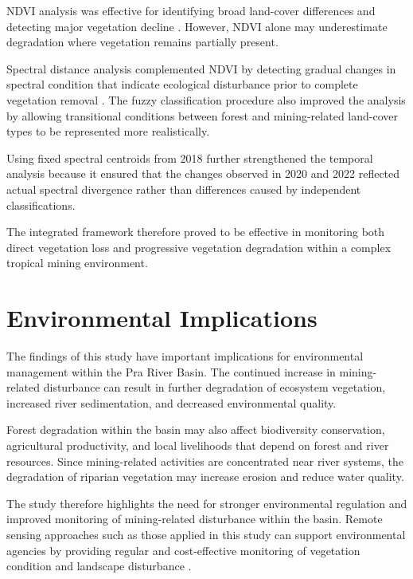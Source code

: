 \documentclass[a4paper,12pt]{report}
\begin{document}
NDVI analysis was effective for identifying broad land-cover differences and detecting major vegetation decline \citep{huete2002overview,pettorelli2005ndvi}. However, NDVI alone may underestimate degradation where vegetation remains partially present.

Spectral distance analysis complemented NDVI by detecting gradual changes in spectral condition that indicate ecological disturbance prior to complete vegetation removal \citep{richards2013remote,singh1989review}. The fuzzy classification procedure also improved the analysis by allowing transitional conditions between forest and mining-related land-cover types to be represented more realistically.

Using fixed spectral centroids from 2018 further strengthened the temporal analysis because it ensured that the changes observed in 2020 and 2022 reflected actual spectral divergence rather than differences caused by independent classifications.

The integrated framework therefore proved to be effective in monitoring both direct vegetation loss and progressive vegetation degradation within a complex tropical mining environment.

\section{Environmental Implications}

The findings of this study have important implications for environmental management within the Pra River Basin. The continued increase in mining-related disturbance can result in further degradation of ecosystem vegetation, increased river sedimentation, and decreased environmental quality.

Forest degradation within the basin may also affect biodiversity conservation, agricultural productivity, and local livelihoods that depend on forest and river resources. Since mining-related activities are concentrated near river systems, the degradation of riparian vegetation may increase erosion and reduce water quality.

The study therefore highlights the need for stronger environmental regulation and improved monitoring of mining-related disturbance within the basin. Remote sensing approaches such as those applied in this study can support environmental agencies by providing regular and cost-effective monitoring of vegetation condition and landscape disturbance \citep{forkuor2012comparison}.
\end{document}
